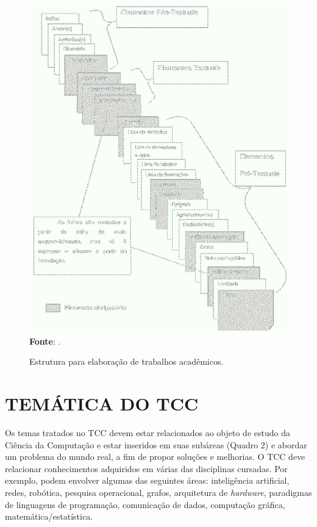 \begin{figure}[htb]
	\centering
	\caption{Estrutura para elaboração de trabalhos acadêmicos.}
	\includegraphics[scale=0.6]{imagens/Estrutura-Trabalhos.png} 
	\newline \footnotesize \textbf{Fonte}: \cite{webLink}.
	\label{fig:EstruturaTrab}
\end{figure}

\section{TEMÁTICA DO TCC}\label{sec:TEMÁTICATCC}
Os temas tratados no TCC devem estar relacionados ao objeto de estudo da Ciência da Computação e estar inseridos em suas subáreas (Quadro 2) e abordar um problema do mundo real, a fim de propor soluções e melhorias. O TCC deve relacionar conhecimentos adquiridos em várias das disciplinas cursadas. Por exemplo, podem envolver algumas das seguintes áreas: inteligência artificial, redes, robótica, pesquisa operacional, grafos, arquitetura de \textit{hardware}, paradigmas de linguagens de programação, comunicação de dados, computação gráfica, matemática/estatística.  

